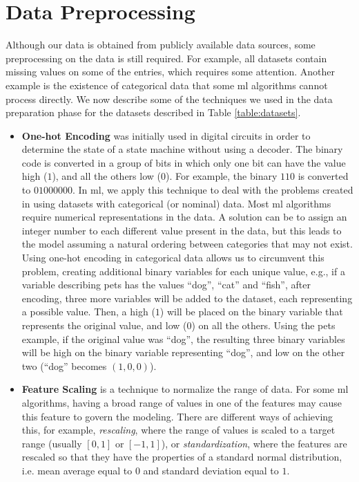 \section{Data Preprocessing}
\label{sec:DataPreProcessingImplementation}

Although our data is obtained from publicly available data sources, some preprocessing on the data is still required.
For example, all datasets contain missing values on some of the entries, which requires some attention. Another example is the existence of categorical data that some \ac{ml} algorithms cannot process directly. We now describe some of the techniques we used in the data preparation phase for the datasets described in Table \ref{table:datasets}.

\begin{itemize}
    

	\item\textbf{One-hot Encoding}\cite{harris2010digital} was initially used in digital circuits in order to determine the state of a state machine without using a decoder. The binary code is converted in a group of bits in which only one bit can have the value high ($1$), and all the others low ($0$). For example, the binary $110$ is converted to $01000000$.
	In \ac{ml}, we apply this technique to deal with the problems created in using datasets with categorical (or nominal) data. Most \ac{ml} algorithms require numerical representations in the data. A solution can be to assign an integer number to each different value present in the data, but this leads to the model assuming a natural ordering between categories that may not exist.
	Using one-hot encoding in categorical data allows us to circumvent this problem, creating additional binary variables for each unique value, e.g., if a variable describing pets has the values ``dog'', ``cat'' and ``fish'', after encoding, three more variables will be added to the dataset, each representing a possible value. Then, a high ($1$) will be placed on the binary variable that represents the original value, and low ($0$) on all the others. Using the pets example, if the original value was ``dog'', the resulting three binary variables will be high on the binary variable representing ``dog'', and low on the other two (``dog'' becomes $(1,0,0)$).

	\item\textbf{Feature Scaling} is a technique to normalize the range of data. For some \ac{ml} algorithms, having a broad range of values in one of the features may cause this feature to govern the modeling. There are different ways of achieving this, for example, \textit{rescaling}, where the range of values is scaled to a target range (usually $[0,1]$ or $[-1,1]$), or \textit{standardization}, where the features are rescaled so that they have the properties of a standard normal distribution, i.e. mean average equal to $0$ and standard deviation equal to $1$.



\end{itemize}


